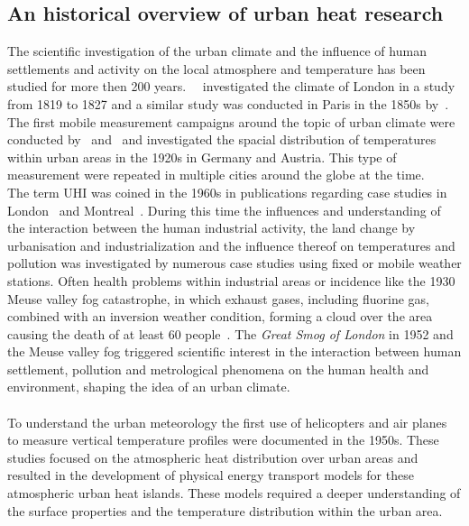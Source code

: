 \documentclass[12pt,a4paper, english,twoside]{article}
\begin{document}
 \subsection{An historical overview of urban heat research}
  The scientific investigation of the urban climate and the influence of human settlements and activity on the local atmosphere and temperature has been studied for more then 200 years.~%
  \cite{Howard1833}~investigated the climate of London in a study from 1819 to 1827 and a similar study was conducted in Paris in the 1850s by~\cite{renou1862differences}.~%
  The first mobile measurement campaigns around the topic of urban climate were conducted by~\cite{peppler1929auto} and~\cite{tollner1932untersuchungen} and investigated the spacial distribution of temperatures within urban areas  in the 1920s in Germany and Austria. 
  This type of measurement were repeated in multiple cities around the globe at the time.\\
  The term \gls{UHI} was coined in the 1960s in publications regarding case studies in London~\autocite{Chandler1961} and Montreal~\autocite{Oke1968}.
  During this time the influences and understanding of the interaction between the human industrial activity, the land change by urbanisation and industrialization and the influence thereof on temperatures and pollution was investigated by numerous case studies using fixed or mobile weather stations.
  Often health problems within industrial areas or incidence like the 1930 Meuse valley fog catastrophe, in which exhaust gases, including fluorine gas, combined with an inversion weather condition, forming a cloud over the area causing the death of at least 60 people~\autocite{Nemery2001}.
  The \textit{Great Smog of London} in 1952 and the Meuse valley fog triggered scientific interest in the interaction between human settlement, pollution and metrological phenomena on the human health and environment, shaping the idea of an urban climate.\\ \\ 
  To understand the urban meteorology the first use of helicopters and air planes to measure vertical temperature profiles were documented in the 1950s.
  These studies focused on the atmospheric heat distribution over urban areas and resulted in the development of physical energy transport models for these atmospheric urban heat islands.
  These models required a deeper understanding of the surface properties and the temperature distribution within the urban area.\\ \\
\end{document}
